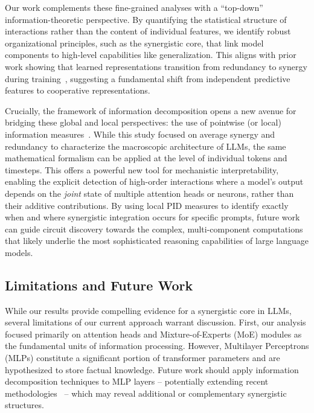 \documentclass[11pt,a4paper]{ouparticle}
\begin{document}
Our work complements these fine-grained analyses with a ``top-down'' information-theoretic perspective. By quantifying the statistical structure of interactions rather than the content of individual features, we identify robust organizational principles, such as the synergistic core, that link model components to high-level capabilities like generalization. This aligns with prior work showing that learned representations transition from redundancy to synergy during training~\cite{Tax2017,Shujian2021cnns}, suggesting a fundamental shift from independent predictive features to cooperative representations.

Crucially, the framework of information decomposition opens a new avenue for bridging these global and local perspectives: the use of pointwise (or local) information measures~\cite{lizier2012local}. While this study focused on average synergy and redundancy to characterize the macroscopic architecture of LLMs, the same mathematical formalism can be applied at the level of individual tokens and timesteps. This offers a powerful new tool for mechanistic interpretability, enabling the explicit detection of high-order interactions where a model's output depends on the \textit{joint} state of multiple attention heads or neurons, rather than their additive contributions. By using local PID measures to identify exactly when and where synergistic integration occurs for specific prompts, future work can guide circuit discovery towards the complex, multi-component computations that likely underlie the most sophisticated reasoning capabilities of large language models.

\subsection*{Limitations and Future Work}

While our results provide compelling evidence for a synergistic core in LLMs, several limitations of our current approach warrant discussion. First, our analysis focused primarily on attention heads and Mixture-of-Experts (MoE) modules as the fundamental units of information processing. However, Multilayer Perceptrons (MLPs) constitute a significant portion of transformer parameters and are hypothesized to store factual knowledge. Future work should apply information decomposition techniques to MLP layers -- potentially extending recent methodologies~\cite{proca2024,ehrlich2023complexity} -- which may reveal additional or complementary synergistic structures.
\end{document}

